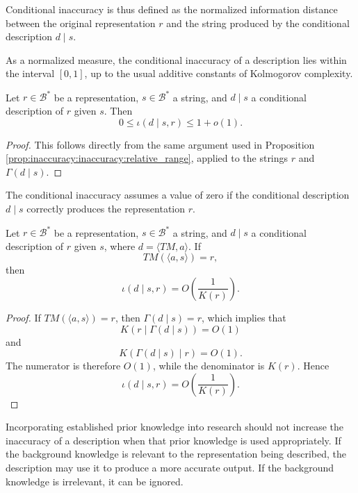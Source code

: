 Conditional inaccuracy is thus defined as the normalized information distance between the original representation \(r\) and the string produced by the conditional description \(d \mid s\).

As a normalized measure, the conditional inaccuracy of a description lies within the interval \([0, 1]\), up to the usual additive constants of Kolmogorov complexity.

\begin{proposition}
\label{prop:range_conditional_inaccuracy}
Let \(r \in \mathcal{B}^\ast\) be a representation, \(s \in \mathcal{B}^\ast\) a string, and \(d \mid s\) a conditional description of \(r\) given \(s\). Then
\[
0 \leq \iota(d \mid s, r) \leq 1+o(1).
\]
\end{proposition}

\begin{proof}
This follows directly from the same argument used in Proposition \ref{prop:inaccuracy:inaccuracy:relative_range}, applied to the strings \(r\) and \(\Gamma(d\mid s)\).
\end{proof}

The conditional inaccuracy assumes a value of zero if the conditional description \(d \mid s\) correctly produces the representation \(r\).

\begin{proposition}
\label{prop:perfect_conditional_description}
Let \(r \in \mathcal{B}^\ast\) be a representation, \(s \in \mathcal{B}^\ast\) a string, and \(d \mid s\) a conditional description of \(r\) given \(s\), where \(d = \langle TM, a \rangle\). If
\[
TM \left(\langle a, s \rangle \right) = r,
\]
then
\[
\iota(d \mid s, r)=O\left(\frac{1}{K(r)}\right).
\]
\end{proposition}

\begin{proof}
If \(TM \left(\langle a, s \rangle \right) = r\), then \(\Gamma(d \mid s) = r\), which implies that
\[
K \left( r \mid \Gamma(d \mid s) \right) = O(1)
\]
and
\[
K \left( \Gamma(d \mid s) \mid r \right) = O(1).
\]
The numerator is therefore \(O(1)\), while the denominator is \(K(r)\). Hence
\[
\iota(d \mid s,r)=O\left(\frac{1}{K(r)}\right).
\]
\end{proof}

Incorporating established prior knowledge into research should not increase the inaccuracy of a description when that prior knowledge is used appropriately. If the background knowledge is relevant to the representation being described, the description may use it to produce a more accurate output. If the background knowledge is irrelevant, it can be ignored.

